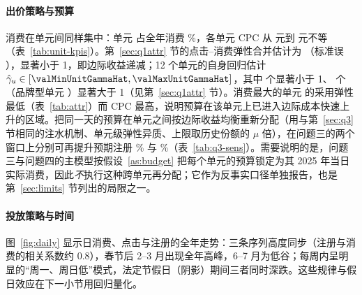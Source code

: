 \paragraph{出价策略与预算}
消费在单元间同样集中：单元 \valBiggestUnitId{} 占全年消费 \valBiggestUnitSpendSharePct\%，各单元 CPC 从 \valMinUnitCpc{} 元到 \valMaxUnitCpc{} 元不等（表~\ref{tab:unit-kpis}）。第~\ref{sec:q1attr} 节的点击--消费弹性合并估计为 \valPooledGamma（标准误 \valPooledGammaSe），显著小于 1，即边际收益递减；12 个单元的自身回归估计 $\hat\gamma_u\in[\valMinUnitGammaHat,\valMaxUnitGammaHat]$，其中 \valUnitsGammaHatBelowOne{} 个显著小于 1、\valUnitsGammaHatAboveOne{} 个（品牌型单元 \valGammaAboveOneUnitId）显著大于 1（见第~\ref{sec:q1attr} 节）。消费最大的单元 \valBiggestUnitId{} 的采用弹性最低（表~\ref{tab:attr}）而 CPC 最高，说明预算在该单元上已进入边际成本快速上升的区域。把同一天的预算在单元之间按边际收益均衡重新分配（用与第~\ref{sec:q3} 节相同的注水机制、单元级弹性异质、上限取历史份额的 $\mu$ 倍），在问题三的两个窗口上分别可再提升预期注册 \valQthreeCrossUnitGainPctFeb\% 与 \valQthreeCrossUnitGainPctAug\%（表~\ref{tab:q3-sens}）。需要说明的是，问题三与问题四的主模型按假设~\ref{as:budget} 把每个单元的预算锁定为其 2025 年当日实际消费，因此\emph{不}执行这种跨单元再分配；它作为反事实口径单独报告，也是第~\ref{sec:limits} 节列出的局限之一。

\paragraph{投放策略与时间}
图~\ref{fig:daily} 显示日消费、点击与注册的全年走势：三条序列高度同步（注册与消费的相关系数约 0.8），春节后 2--3 月出现全年高峰，6--7 月为低谷；每周内呈明显的“周一、周日低”模式，法定节假日（阴影）期间三者同时深跌。这些规律与假日效应在下一小节用回归量化。


